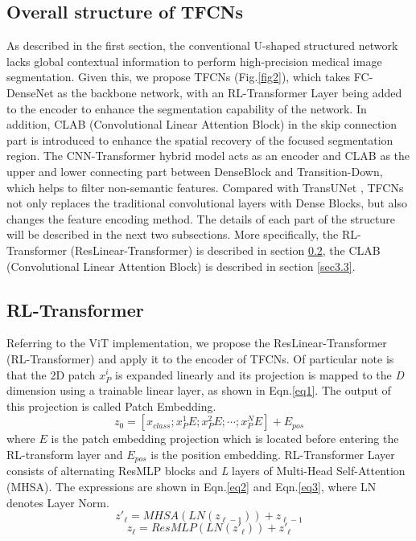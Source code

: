 \documentclass[runningheads]{llncs}
\begin{document}
\subsection{Overall structure of TFCNs}
\label{sec3.1}
As described in the first section, the conventional U-shaped structured network lacks global contextual information to perform high-precision medical image segmentation. Given this, we propose TFCNs (Fig.\ref{fig2}), which takes FC-DenseNet \cite{zhang2018automatic} as the backbone network, with an RL-Transformer Layer being added to the encoder to enhance the segmentation capability of the network. In addition, CLAB (Convolutional Linear Attention Block) in the skip connection part is introduced to enhance the spatial recovery of the focused segmentation region. The CNN-Transformer hybrid model acts as an encoder and CLAB as the upper and lower connecting part between DenseBlock and Transition-Down, which helps to filter non-semantic features. Compared with TransUNet \cite{chen2021transunet}, TFCNs not only replaces the traditional convolutional layers with Dense Blocks, but also changes the feature encoding method. The details of each part of the structure will be described in the next two subsections. More specifically, the RL-Transformer (ResLinear-Transformer) is described in section \ref{sec3.2}, the CLAB (Convolutional Linear Attention Block) is described in section \ref{sec3.3}.

\subsection{RL-Transformer}
\label{sec3.2}
Referring to the ViT \cite{dosovitskiy2020image} implementation, we propose the ResLinear-Transformer (RL-Transformer) and apply it to the encoder of TFCNs. Of particular note is that the 2D patch $x_{P}^{i}$ is expanded linearly and its projection is mapped to the \emph{D} dimension using a trainable linear layer, as shown in Eqn.\ref{eq1}. The output of this projection is called Patch Embedding.
\begin{equation}
{z_0} = [x_{class};x_P^1E;x_P^2E; \cdots ;x_P^NE] + {E_{pos}}
\label{eq1}
\end{equation}
where $E$ is the patch embedding projection which is located before entering the RL-transform layer and ${E_{pos}}$ is the position embedding. RL-Transformer Layer consists of alternating ResMLP blocks and \emph{L} layers of Multi-Head Self-Attention (MHSA). The expressions are shown in Eqn.\ref{eq2} and Eqn.\ref{eq3}, where LN denotes Layer Norm.
\begin{equation}
{z'_\ell } = MHSA(LN({z_{\ell  - 1}})) + {z_{\ell  - 1}}
\label{eq2}
\end{equation}
\begin{equation}
{z_\ell } = ResMLP(LN({z'_\ell })) + {z'_\ell }
\label{eq3}
\end{equation}
\end{document}
